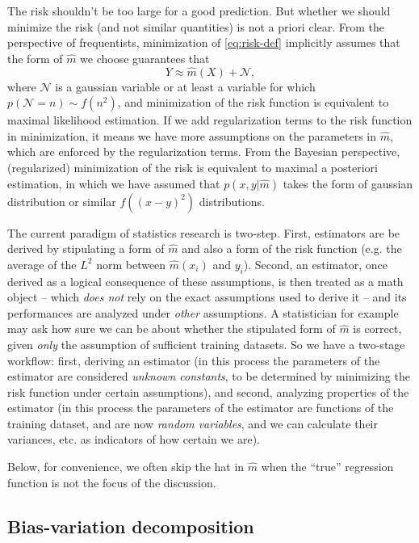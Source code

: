 \documentclass[hyperref, a4paper]{article}
\begin{document}
The risk shouldn't be too large for a good prediction.
But whether we should minimize the risk (and not similar quantities) is not a priori clear.
From the perspective of frequentists,
minimization of \eqref{eq:risk-def} implicitly assumes that 
the form of $\hat{m}$ we choose guarantees that 
\begin{equation}
    Y \approx \hat{m}(X) + \mathcal{N},
\end{equation}
where $\mathcal{N}$ is a gaussian variable or at least a variable 
for which $p(\mathcal{N} = n) \sim f(n^2)$,
and minimization of the risk function is equivalent to maximal likelihood estimation.
If we add regularization terms to the risk function in minimization,
it means we have more assumptions on the parameters in $\hat{m}$,
which are enforced by the regularization terms.
From the Bayesian perspective, (regularized) minimization of the risk
is equivalent to maximal a posteriori estimation,
in which we have assumed that $p(x, y | \hat{m})$ takes the form of gaussian distribution
or similar $f((x - y)^2)$ distributions.

The current paradigm of statistics research is two-step.
First, estimators are be derived by stipulating a form of $\hat{m}$ and also a form of the risk function
(e.g. the average of the $L^2$ norm between $\hat{m}(x_i)$ and $y_i$).
Second, an estimator, once derived as a logical consequence of these assumptions,
is then treated as a math object -- which \emph{does not} rely on the exact assumptions used to derive it --
and its performances are analyzed under \emph{other} assumptions.
A statistician for example may ask how sure we can be about 
whether the stipulated form of $\hat{m}$ is correct,
given \emph{only} the assumption of sufficient training datasets.
So we have a two-stage workflow:
first, deriving an estimator (in this process the parameters of the estimator are considered 
\emph{unknown constants}, to be determined by minimizing the risk function under certain assumptions),
and second, analyzing properties of the estimator 
(in this process the parameters of the estimator are functions of the training dataset,
and are now \emph{random variables},
and we can calculate their variances, etc. as indicators of how certain we are).

Below, for convenience, we often skip the hat in $\hat{m}$
when the ``true'' regression function is not the focus of the discussion.

\subsection{Bias-variation decomposition}
\end{document}
